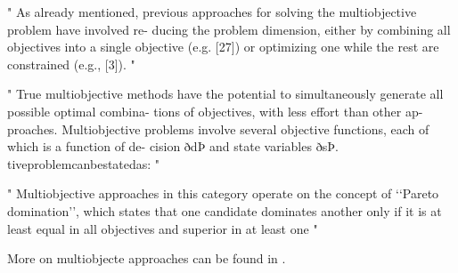 "
As already mentioned, previous approaches for solving the multiobjective problem have involved re- ducing the problem dimension, either by combining all objectives into a single objective (e.g. [27]) or optimizing one while the rest are constrained (e.g., [3]).
"\cite{erickson_multi-objective_2002}

"
True multiobjective methods have the potential to simultaneously generate all possible optimal combina- tions of objectives, with less effort than other ap- proaches. Multiobjective problems involve several objective functions, each of which is a function of de- cision ðdÞ and state variables ðsÞ. tiveproblemcanbestatedas:
"\cite{erickson_multi-objective_2002}

"
Multiobjective approaches in this category operate on the concept of ‘‘Pareto domination’’, which states that one candidate dominates another only if it is at least equal in all objectives and superior in at least one
"\cite{erickson_multi-objective_2002}

More on multiobjecte approaches can be found in \cite{erickson_multi-objective_2002}.

\fi










